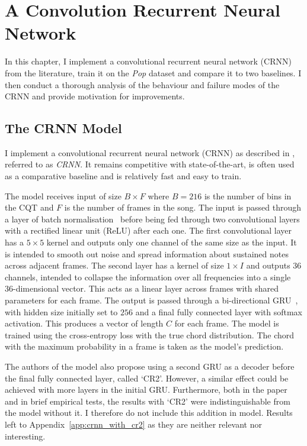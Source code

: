 \chapter{A Convolution Recurrent Neural Network}\label{chap:crnn}

In this chapter, I implement a convolutional recurrent neural network (CRNN) from the literature, train it on the \emph{Pop} dataset and compare it to two baselines. I then conduct a thorough analysis of the behaviour and failure modes of the CRNN and provide motivation for improvements. 

\section{The CRNN Model}\label{sec:crnn}

I implement a convolutional recurrent neural network (CRNN) as described in \citet{StructuredTraining}, referred to as \emph{CRNN}. It remains competitive with state-of-the-art, is often used as a comparative baseline and is relatively fast and easy to train.

The model receives input of size $B \times F$ where $B=216$ is the number of bins in the CQT and $F$ is the number of frames in the song. The input is passed through a layer of batch normalisation~\citep{BatchNorm} before being fed through two convolutional layers with a rectified linear unit (ReLU) after each one. The first convolutional layer has a $5\times 5$ kernel and outputs only one channel of the same size as the input. It is intended to smooth out noise and spread information about sustained notes across adjacent frames. The second layer has a kernel of size $1\times I$ and outputs 36 channels, intended to collapse the information over all frequencies into a single 36-dimensional vector. This acts as a linear layer across frames with shared parameters for each frame. The output is passed through a bi-directional GRU~\citep{GRU}, with hidden size initially set to $256$ and a final fully connected layer with softmax activation. This produces a vector of length $C$ for each frame. The model is trained using the cross-entropy loss with the true chord distribution. The chord with the maximum probability in a frame is taken as the model's prediction.

The authors of the model also propose using a second GRU as a decoder before the final fully connected layer, called `CR2'. However, a similar effect could be achieved with more layers in the initial GRU. Furthermore, both in the paper and in brief empirical tests, the results with `CR2' were indistinguishable from the model without it. I therefore do not include this addition in model. Results left to Appendix~\ref{app:crnn_with_cr2} as they are neither relevant nor interesting.

